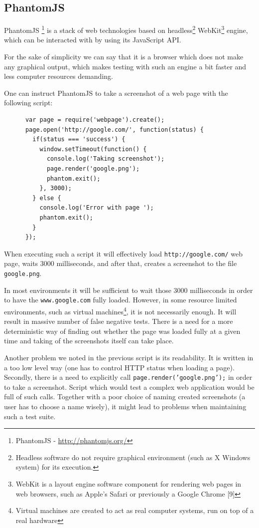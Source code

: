 \documentclass[11pt,oneside,final]{fithesis2}
\begin{document}
    \subsection{PhantomJS}
    \label{subsec:phantomJS}
    PhantomJS \footnote{PhantomJS - \url{http://phantomjs.org/}} is a stack of web technologies based on headless\footnote{Headless software do not require graphical environment (such as X Windows system) for its execution.} 
    WebKit\footnote{WebKit is a layout engine software component for rendering web pages in web browsers, such as Apple's Safari or previously a Google Chrome [9]} engine, which can be 
    interacted with by using its JavaScript API.
    
    For the sake of simplicity we can say that it is a browser which does not make any graphical output, which makes testing with such an engine a bit faster and less computer resources 
    demanding.
    
    One can instruct PhantomJS to take a screenshot of a web page with the following script:
  
    \begin{verbatim}
      var page = require('webpage').create();
      page.open('http://google.com/', function(status) {
        if(status === 'success') {
          window.setTimeout(function() {
            console.log('Taking screenshot');
            page.render('google.png');
            phantom.exit();
          }, 3000);
        } else {
          console.log('Error with page ');
          phantom.exit();
        }
      });
    \end{verbatim}
    
    When executing such a script it will effectively load \texttt{http://google.com/} web page, waits 3000 milliseconds, and after that, creates a screenshot to the file \texttt{google.png}.
    
    In most environments it will be sufficient to wait those 3000 milliseconds in order to have the \texttt{www.google.com} fully loaded. However, in some resource limited environments, 
    such as virtual machines\footnote{Virtual machines are created to act as real computer systems, run on top of a real hardware}, it is not necessarily enough. 
    It will result in massive number of false negative tests. There is a need for a more deterministic way of finding out whether the page was loaded fully at a given time and 
    taking of the screenshots itself can take place.
    
    Another problem we noted in the previous script is its readability. It is written in a too low level way (one has to control HTTP status when loading a page). Secondly, there is a need
    to explicitly call \texttt{page.render('google.png');} in order to take a screenshot. Script which would test a complex web application would be full of such calls. Together with a poor
    choice of naming created screenshots (a user has to choose a name wisely), it might lead to problems when maintaining such a test suite.
    
\end{document}
